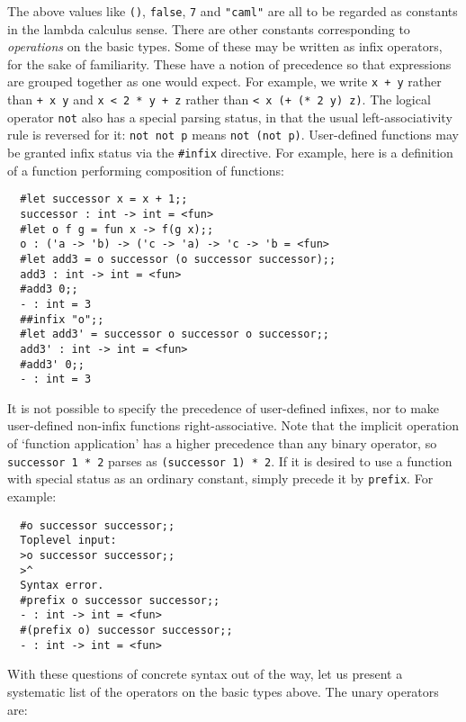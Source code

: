 The above values like {\tt ()}, {\tt false}, {\tt 7} and {\tt "caml"} are all
to be regarded as constants in the lambda calculus sense. There are other
constants corresponding to {\em operations} on the basic types. Some of these
may be written as infix operators, for the sake of familiarity. These have a
notion of precedence so that expressions are grouped together as one would
expect. For example, we write {\tt x + y} rather than {\tt + x y} and {\tt x <
2 * y + z} rather than {\tt < x (+ (* 2 y) z)}. The logical operator {\tt not}
also has a special parsing status, in that the usual left-associativity rule is
reversed for it: {\tt not not p} means {\tt not (not p)}. User-defined
functions may be granted infix status via the {\tt \#infix} directive. For
example, here is a definition of a function performing composition of
functions:

\begin{boxed}\begin{verbatim}
  #let successor x = x + 1;;
  successor : int -> int = <fun>
  #let o f g = fun x -> f(g x);;
  o : ('a -> 'b) -> ('c -> 'a) -> 'c -> 'b = <fun>
  #let add3 = o successor (o successor successor);;
  add3 : int -> int = <fun>
  #add3 0;;
  - : int = 3
  ##infix "o";;
  #let add3' = successor o successor o successor;;
  add3' : int -> int = <fun>
  #add3' 0;;
  - : int = 3
\end{verbatim}\end{boxed}

It is not possible to specify the precedence of user-defined infixes, nor to
make user-defined non-infix functions right-associative. Note that the implicit
operation of `function application' has a higher precedence than any binary
operator, so {\tt successor 1 * 2} parses as {\tt (successor 1) * 2}. If it is
desired to use a function with special status as an ordinary constant, simply
precede it by {\tt prefix}. For example:

\begin{boxed}\begin{verbatim}
  #o successor successor;;
  Toplevel input:
  >o successor successor;;
  >^
  Syntax error.
  #prefix o successor successor;;
  - : int -> int = <fun>
  #(prefix o) successor successor;;
  - : int -> int = <fun>
\end{verbatim}\end{boxed}

With these questions of concrete syntax out of the way, let us present a
systematic list of the operators on the basic types above. The unary operators
are:

